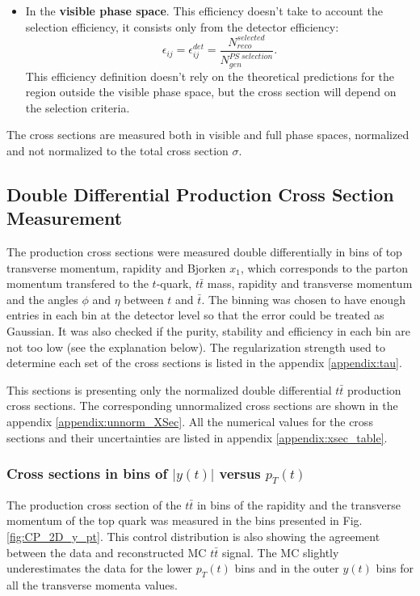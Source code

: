 \begin{itemize}
 \item In the \textbf{visible phase space}. This efficiency doesn't take to account the selection efficiency, it consists only from the detector efficiency:
 \begin{equation}
  \epsilon_{ij} = \epsilon_{ij}^{det} = \frac{N^{selected}_{reco}}{N^{PS\;selection}_{gen}}.
 \end{equation}
 This efficiency definition doesn't rely on the theoretical predictions for the region outside the visible phase space, but the cross section will depend on
 the selection criteria.
\end{itemize}

The cross sections are measured both in visible and full phase spaces, normalized and not normalized to the total cross section $\sigma$. 


\subsection{Double Differential Production Cross Section Measurement}\label{ssec:xsec_mes}

The production cross sections were measured double differentially in bins of top transverse momentum, rapidity and Bjorken $x_{1}$,
which corresponds to the parton momentum transfered to the $t$-quark,
$t\bar{t}$ mass, rapidity and transverse momentum and the angles $\phi$ and $\eta$ between $t$ and $\bar{t}$.
The binning was chosen to have enough entries in each bin at the detector level so that the error could be treated as Gaussian.
It was also checked if the purity, stability and efficiency in each bin are not too low (see the explanation below).
The regularization strength used to determine each set of the cross sections is listed in the appendix \ref{appendix:tau}.

This sections is presenting only the normalized double differential $t\bar{t}$ production cross sections. The corresponding
unnormalized cross sections are shown in the appendix \ref{appendix:unnorm_XSec}. All the numerical values for the cross sections
and their uncertainties are listed in appendix \ref{appendix:xsec_table}.

\subsubsection{Cross sections in bins of $|y(t)|$ versus $p_{T}(t)$}

The production cross section of the $t\bar{t}$ in bins of the rapidity and the transverse momentum of the top quark was
measured in the bins presented in Fig. \ref{fig:CP_2D_y_pt}. This control distribution is also showing the agreement between 
the data and reconstructed MC $t\bar{t}$ signal. The MC slightly underestimates the data for the lower $p_{T}(t)$ bins and 
in the outer $y(t)$ bins for all the transverse momenta values.


